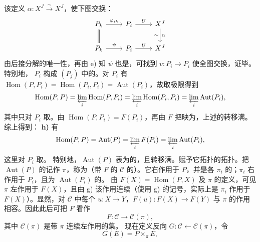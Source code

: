该定义 $\alpha:X^J\xrightarrow{\sim}X^J$，使下图交换：
\[\begin{tikzcd}P_k\arrow[r,"\varphi_{ik}"]\arrow[d,equal]&P_i\arrow[r,"U"]&X^J\arrow[d,"\alpha", "\sim"']\\P_k\arrow[r,"\psi"]&P_i\arrow[r,"U"]&X^J\end{tikzcd}\]
由后接分解的唯一性，再由 e) 知 $\psi$ 也是，可找到 $v:P_i\to P_i$ 使全图交换，证毕。
特别地， $P_i$ 构成 $(P_j)$ 中的。对 $P_i$ 有 $\operatorname{Hom}(P,P_i)=\operatorname{Hom}(P_i,P_i)=\operatorname{Aut}(P_i)$，故取极限得到
\[\operatorname{Hom}(P,P)=\varprojlim_i\operatorname{Hom}(P,P_i)=\varprojlim_i\operatorname{Hom}(P_i,P_i)=\varprojlim_i\operatorname{Aut}(P_i),\]
其中只对 $P_i$ 取。由 $\operatorname{Hom}(P,P_i)=F(P_i)$，再由 $F$ 把映为，上述的转移满。综上得到：
\textbf{h)} 有
\[\operatorname{Hom}(P,P)=\operatorname{Aut}(P)=\varprojlim_iF(P_i)=\varprojlim_i\operatorname{Aut}(P_i),\]
这里对 $P_i$ 取。
特别地，$\operatorname{Aut}(P)$ 表为的，且转移满。赋予它拓扑的拓扑。把 $\operatorname{Aut}(P)$ 的记作 $\pi$，称为（带 $F$ 的 $\mathcal C$ 的）。它右作用于 $P$，并是各 $\pi_i$ 的；$\pi_i$ 右作用于 $P_i$，且为 $\operatorname{Aut}(P_i)$ 的。
由 $F(X)=\operatorname{Hom}(P,X)$ 及 $\pi$ 的定义，可见 $\pi$ 左作用于 $F(X)$，且由 g) 该作用连续（使用 g) 的记号，实际上是 $\pi_i$ 作用于 $F(X)$）。显然，对 $\mathcal C$ 中每个 $u:X\to Y$，$F(u):F(X)\to F(Y)$ 与 $\pi$ 的作用相容。因此此后可把 $F$ 看作
\[F:\mathcal C\longrightarrow\mathcal C(\pi),\]
其中 $\mathcal C(\pi)$ 是带 $\pi$ 连续左作用的集。
现在定义反向 $G:\mathcal C\leftarrow\mathcal C(\pi)$，令
\[G(E)=P\times_\pi E,\]
